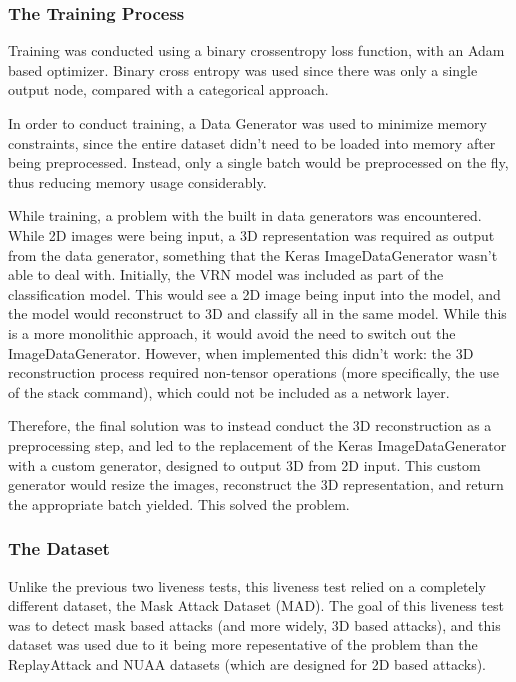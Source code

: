 \documentclass[11pt,a4paper]{article}
\begin{document}
        \subsubsection{The Training Process}
            Training was conducted using a binary crossentropy loss function, with an Adam based optimizer. Binary cross entropy was used since there was only a single output node,
            compared with a categorical approach. 

            In order to conduct training, a Data Generator was used to minimize memory constraints, since the entire dataset didn't need to be loaded into memory after being preprocessed. Instead,
            only a single batch would be preprocessed on the fly, thus reducing memory usage considerably.

            While training, a problem with the built in data generators was encountered. While 2D images were being input, a 3D representation was required as output from the data generator,
            something that the Keras ImageDataGenerator wasn't able to deal with. Initially, the VRN model was included as part of the classification model. This would see a 2D image being input into the model,
            and the model would reconstruct to 3D and classify all in the same model. While this is a more monolithic approach, it would avoid the need to switch out the ImageDataGenerator. However,
            when implemented this didn't work: the 3D reconstruction process required non-tensor operations (more specifically, the use of the stack command), which could not be included as a network layer.

            Therefore, the final solution was to instead conduct the 3D reconstruction as a preprocessing step, and led to the replacement of the Keras ImageDataGenerator with a custom generator, designed to output 3D from 2D input.
            This custom generator would resize the images, reconstruct the 3D representation, and return the appropriate batch yielded. This solved the problem.

        \subsubsection{The Dataset}
            Unlike the previous two liveness tests, this liveness test relied on a completely different dataset, the Mask Attack Dataset (MAD). \cite{3DMadDataset}
            The goal of this liveness test was to detect mask based attacks (and more widely, 3D based attacks), and this dataset was used due to it being more repesentative of the problem
            than the ReplayAttack and NUAA datasets (which are designed for 2D based attacks).
\end{document}
